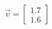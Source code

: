 \documentclass[preview]{standalone}
\begin{document}
\begin{align*}
\vec{v}=\begin{bmatrix}1.7\\1.6\end{bmatrix}
\end{align*}
\end{document}

